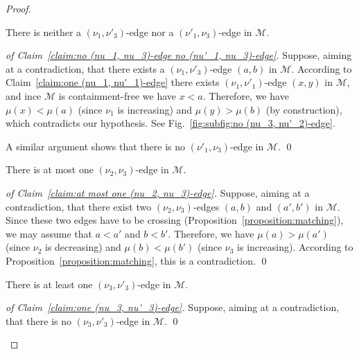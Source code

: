 \documentclass[a4paper,10pt]{llncs}
\begin{document}
\begin{proof}
  \begin{claim}
    \label{claim:no (nu_1, nu_3)-edge no (nu'_1, nu_3)-edge}
    There is neither a $(\nu_1, \nu'_3)$-edge nor a $(\nu'_1, \nu_3)$-edge
    in $\mathcal{M}$.
  \end{claim}

  \begin{proof}[of Claim~\ref{claim:no (nu_1, nu_3)-edge no (nu'_1, nu_3)-edge}]
    Suppose, aiming at a contradiction, that there exists a
    $(\nu_1, \nu'_3)$-edge $(a, b)$ in $\mathcal{M}$.
    According to Claim~\ref{claim:one (nu_1, nu'_1)-edge} there exists
    $(\nu_1, \nu'_1)$-edge $(x, y)$ in $\mathcal{M}$,
    and ince $\mathcal{M}$ is containment-free we have $x < a$.
    Therefore, we have
    $\mu(x) < \mu(a)$ (since $\nu_1$ is increasing)
    and
    $\mu(y) > \mu(b)$ (by construction),
    which contradicts our hypothesis.
    See Fig.~\ref{fig:subfig:no (nu_3, nu'_2)-edge}.

    A similar argument shows that there is no
    $(\nu'_1, \nu_3)$-edge in $\mathcal{M}$.
    \qed
  \end{proof}

  \begin{claim}
    \label{claim:at most one (nu_2, nu_3)-edge}
    There is at most one $(\nu_2, \nu_3)$-edge
    in $\mathcal{M}$.
  \end{claim}

  \begin{proof}[of Claim~\ref{claim:at most one (nu_2, nu_3)-edge}]
    Suppose, aiming at a contradiction, that there exist two
    $(\nu_2, \nu_3)$-edges $(a, b)$ and $(a', b')$ in $\mathcal{M}$.
    Since these two edges have to be crossing
    (Proposition~\ref{proposition:matching}), we may assume that
    $a < a'$ and $b < b'$.
    Therefore, we have
    $\mu(a) > \mu(a')$ (since $\nu_2$ is decreasing)
    and
    $\mu(b) < \mu(b')$ (since $\nu_3$ is increasing).
    According to Proposition~\ref{proposition:matching}, this is
    a contradiction.
    \qed
  \end{proof}

  \begin{claim}
    \label{claim:one (nu_3, nu'_3)-edge}
    There is at least one $(\nu_3, \nu'_3)$-edge in $\mathcal{M}$.
  \end{claim}

  \begin{proof}[of Claim~\ref{claim:one (nu_3, nu'_3)-edge}]
    Suppose, aiming at a contradiction, that there is no
    $(\nu_3, \nu'_3)$-edge in $\mathcal{M}$.
    \qed
  \end{proof}


\end{proof}
\end{document}
